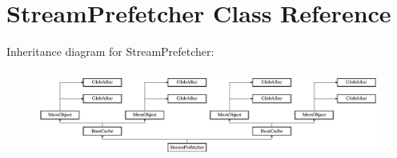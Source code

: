\hypertarget{classStreamPrefetcher}{\section{Stream\-Prefetcher Class Reference}
\label{classStreamPrefetcher}
}
Inheritance diagram for Stream\-Prefetcher\-:\begin{figure}[H]
\begin{center}
\leavevmode
\includegraphics[height=2.941177cm]{classStreamPrefetcher}
\end{center}
\end{figure}
